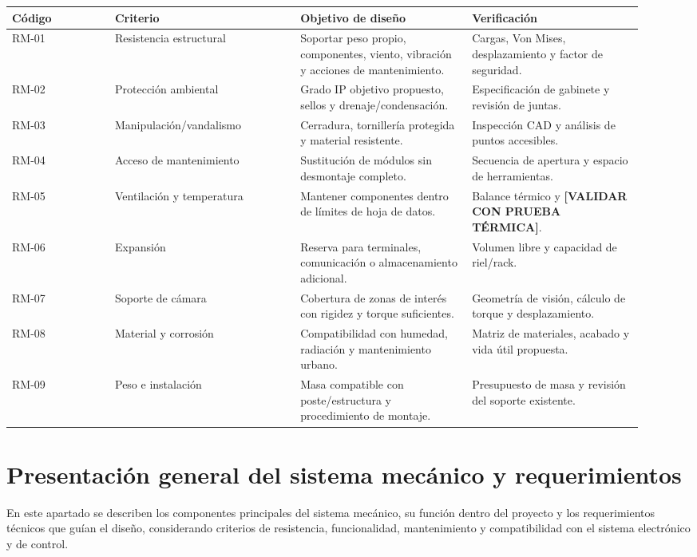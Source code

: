 \documentclass[12pt,a4paper,oneside]{report}
\begin{document}
\begin{longtable}{@{}p{0.15\linewidth}p{0.27\linewidth}p{0.25\linewidth}p{0.25\linewidth}@{}}
\toprule
\textbf{Código} & \textbf{Criterio} & \textbf{Objetivo de diseño} & \textbf{Verificación}\\
\midrule
\endhead
RM-01 & Resistencia estructural & Soportar peso propio, componentes, viento, vibración y acciones de mantenimiento. & Cargas, Von Mises, desplazamiento y factor de seguridad.\\
RM-02 & Protección ambiental & Grado IP objetivo propuesto, sellos y drenaje/condensación. & Especificación de gabinete y revisión de juntas.\\
RM-03 & Manipulación/vandalismo & Cerradura, tornillería protegida y material resistente. & Inspección CAD y análisis de puntos accesibles.\\
RM-04 & Acceso de mantenimiento & Sustitución de módulos sin desmontaje completo. & Secuencia de apertura y espacio de herramientas.\\
RM-05 & Ventilación y temperatura & Mantener componentes dentro de límites de hoja de datos. & Balance térmico y \textbf{[VALIDAR CON PRUEBA TÉRMICA]}.\\
RM-06 & Expansión & Reserva para terminales, comunicación o almacenamiento adicional. & Volumen libre y capacidad de riel/rack.\\
RM-07 & Soporte de cámara & Cobertura de zonas de interés con rigidez y torque suficientes. & Geometría de visión, cálculo de torque y desplazamiento.\\
RM-08 & Material y corrosión & Compatibilidad con humedad, radiación y mantenimiento urbano. & Matriz de materiales, acabado y vida útil propuesta.\\
RM-09 & Peso e instalación & Masa compatible con poste/estructura y procedimiento de montaje. & Presupuesto de masa y revisión del soporte existente.\\
\bottomrule
\end{longtable}

\section{Presentación general del sistema mecánico y requerimientos}\label{presentaciuxf3n-general-del-sistema-mecuxe1nico-y-requerimientos}

En este apartado se describen los componentes principales del sistema mecánico, su función dentro del proyecto y los requerimientos técnicos que guían el diseño, considerando criterios de resistencia, funcionalidad, mantenimiento y compatibilidad con el sistema electrónico y de control.
\end{document}

